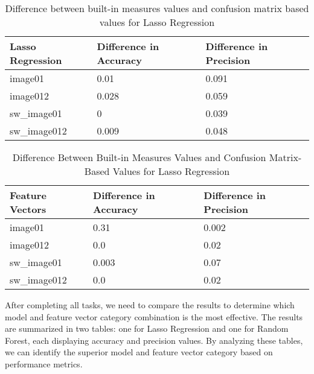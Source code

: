 \documentclass[conference,12pt]{IEEEtran}
\begin{document}
\begin{table}[h!]
\centering
\scriptsize %
\caption{Difference between built-in measures values and confusion matrix based values for Lasso Regression}
\begin{tabular}{|p{2cm}|p{2cm}|p{2cm}|}
\hline
\textbf{Lasso Regression} & \textbf{Difference in Accuracy} & \textbf{Difference in Precision} \\ \hline
image01 & 0.01 & 0.091 \\ \hline
image012 & 0.028 & 0.059 \\ \hline
sw\_image01 & 0 & 0.039 \\ \hline
sw\_image012 & 0.009 & 0.048 \\ \hline
\end{tabular}
\label{table:lasso_regression}
\end{table} 

\begin{table}[h!]
\centering
\scriptsize %
\caption{Difference Between Built-in Measures Values and Confusion Matrix-Based Values for Lasso Regression}
\begin{tabular}{|p{2cm}|p{2cm}|p{2cm}|}
\hline
\textbf{Feature Vectors} & \textbf{Difference in Accuracy} & \textbf{Difference in Precision} \\ \hline
image01 & 0.31 & 0.002 \\ \hline
image012 & 0.0 & 0.02 \\ \hline
sw\_image01 & 0.003 & 0.07 \\ \hline
sw\_image012 & 0.0 & 0.02 \\ \hline
\end{tabular}
\label{table:lasso_regression}
\end{table}


After completing all tasks, we need to compare the results to determine which model and feature vector category combination is the most effective. The results are summarized in two tables: one for Lasso Regression and one for Random Forest, each displaying accuracy and precision values. By analyzing these tables, we can identify the superior model and feature vector category based on performance metrics.

\begin{table}[h!]
\centering
\caption{Lasso Regression Model Performance Using Built-in Measures}
\label{table:lasso_performance}
\end{table}
\end{document}
